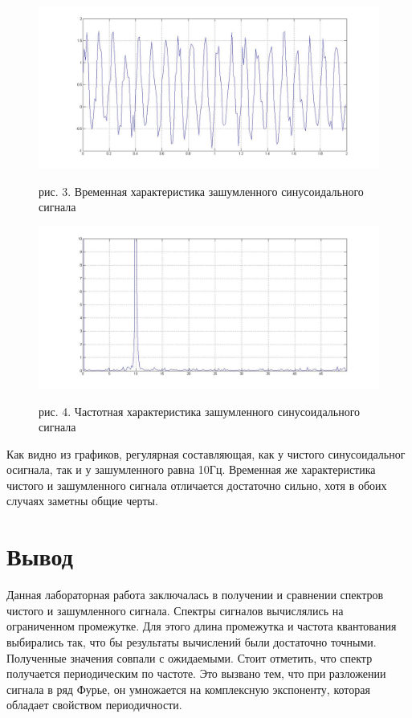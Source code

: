 \documentclass[10pt,a4paper]{report}
\begin{document}
\begin{figure}
\begin{center}
\includegraphics[width=150mm, scale = 0.3]{nsint.jpg}
\end{center}
рис. 3. Временная характеристика зашумленного синусоидального сигнала
\begin{center}
\includegraphics[width=150mm, scale = 0.3]{nsinch.jpg}
\end{center}
рис. 4. Частотная характеристика зашумленного синусоидального сигнала
\end{figure}
Как видно из графиков, регулярная составляющая, как у чистого синусоидальног осигнала, так и у зашумленного равна 10Гц. Временная же характеристика чистого и зашумленного сигнала отличается достаточно сильно, хотя в обоих случаях заметны общие черты.
\section{Вывод}
Данная лабораторная работа заключалась в получении и сравнении спектров чистого и зашумленного сигнала. Спектры сигналов вычислялись на ограниченном промежутке. Для этого длина промежутка и частота квантования выбирались так, что бы результаты вычислений были достаточно точными. Полученные значения совпали с ожидаемыми. Стоит отметить, что спектр получается периодическим по частоте. Это вызвано тем, что при разложении сигнала в ряд Фурье, он умножается на комплексную экспоненту, которая обладает свойством периодичности.
\end{document}
